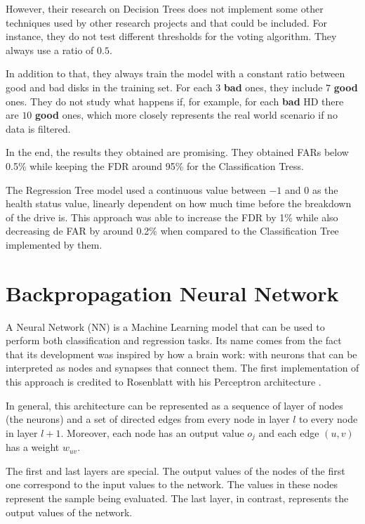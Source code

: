 However, their research on Decision Trees does not implement some other techniques used by other research projects and that could be included.
For instance, they do not test different thresholds for the voting algorithm.
They always use a ratio of $0.5$.

In addition to that, they always train the model with a constant ratio between good and bad disks in the training set.
For each $3$ \textbf{bad} ones, they include $7$ \textbf{good} ones.
They do not study what happens if, for example, for each \textbf{bad} HD there are $10$ \textbf{good} ones, which more closely represents the real world scenario if no data is filtered.

In the end, the results they obtained are promising.
They obtained FARs below 0.5\% while keeping the FDR around 95\% for the Classification Tress.

The Regression Tree model used a continuous value between $-1$ and $0$ as the health status value, linearly dependent on how much time before the breakdown of the drive is.
This approach was able to increase the FDR by 1\% while also decreasing de FAR by around 0.2\% when compared to the Classification Tree implemented by them.

\section{Backpropagation Neural Network}\label{sec:BackpropagationNeuralNetwork}

A Neural Network (NN) is a Machine Learning model that can be used to perform both classification and regression tasks.
Its name comes from the fact that its development was inspired by how a brain work: with neurons that can be interpreted as nodes and synapses that connect them.
The first implementation of this approach is credited to Rosenblatt with his Perceptron architecture \cite{rosenblatt1957perceptron}.

In general, this architecture can be represented as a sequence of layer of nodes (the neurons) and a set of directed edges from every node in layer $l$ to every node in layer $l+1$.
Moreover, each node has an output value $o_j$ and each edge $(u, v)$ has a weight $w_{uv}$.

The first and last layers are special.
The output values of the nodes of the first one correspond to the input values to the network.
The values in these nodes represent the sample being evaluated.
The last layer, in contrast, represents the output values of the network.

